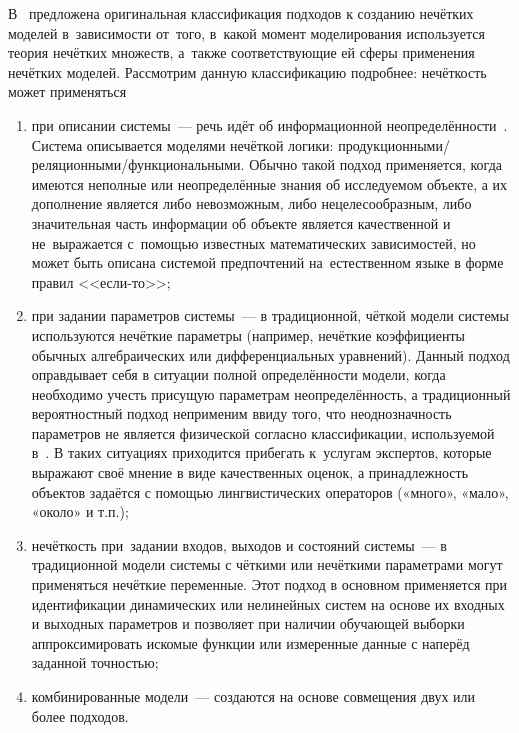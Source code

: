 В~\cite{Borisov_Fedulov} предложена оригинальная классификация подходов к созданию нечётких моделей в~зависимости от~того, в~какой момент моделирования используется теория нечётких множеств, а~также соответствующие ей сферы применения нечётких моделей. Рассмотрим данную классификацию подробнее: нечёткость может применяться
\begin{enumerate}
	\item при описании системы~--- речь идёт об информационной неопределённости~\cite{Pospelov, Borisov_Alexeev_Msk}. Система описывается моделями нечёткой логики: продукционными/реляционными/функциональными. Обычно такой подход применяется, когда имеются неполные или неопределённые знания об исследуемом объекте, а их дополнение является либо невозможным, либо нецелесообразным, либо значительная часть информации об объекте является качественной и не~выражается с~помощью известных математических зависимостей, но может быть описана системой предпочтений на~естественном языке в форме правил <<если-то>>;
	\item при задании параметров системы~--- в традиционной, чёткой модели системы используются нечёткие параметры (например, нечёткие коэффициенты обычных алгебраических или дифференциальных уравнений). Данный подход оправдывает себя в ситуации полной определённости модели, когда необходимо учесть присущую параметрам неопределённость, а традиционный вероятностный подход неприменим ввиду того, что неоднозначность параметров не является физической согласно классификации, используемой в~\cite{Borisov_Alexeev_Msk}. В таких ситуациях приходится прибегать к~услугам экспертов, которые выражают своё мнение в виде качественных оценок, а принадлежность объектов задаётся с помощью лингвистических операторов («много», «мало», «около» и т.п.);
	\item нечёткость при~задании входов, выходов и состояний системы~--- в традиционной модели системы с чёткими или нечёткими параметрами могут применяться нечёткие переменные. Этот подход в основном применяется при идентификации динамических или нелинейных систем на основе их входных и выходных параметров и позволяет при наличии обучающей выборки аппроксимировать искомые функции или измеренные данные с наперёд заданной точностью;
	\item комбинированные модели~--- создаются на основе совмещения двух или более подходов.
\end{enumerate}

